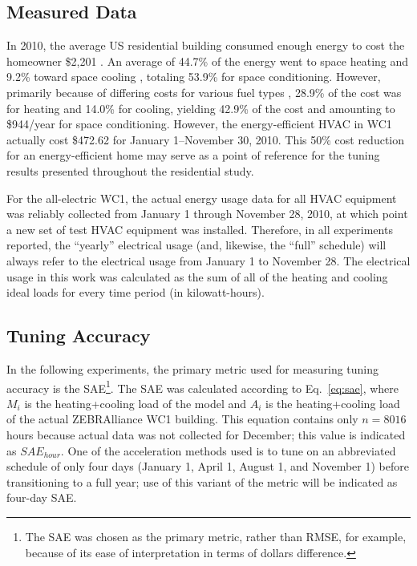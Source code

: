 \documentclass[preprint, review, 12pt]{elsarticle}
\begin{document}
\subsection{Measured Data}
In 2010, the average US residential building consumed enough energy to cost the homeowner \$2,201 \cite{cit:doe2012a}. An average of 44.7\% of the energy went to space heating and 9.2\% toward space cooling \cite{cit:doe2012b}, totaling 53.9\% for space conditioning. However, primarily because of differing costs for various fuel types \cite{cit:doe2012c}, 28.9\% of the cost was for heating and 14.0\% for cooling, yielding 42.9\% of the cost and amounting to \$944/year for space conditioning. However, the energy-efficient HVAC in WC1 actually cost \$472.62 for January 1--November 30, 2010. This 50\% cost reduction for an energy-efficient home may serve as a point of reference for the tuning results presented throughout the residential study.

For the all-electric WC1, the actual energy usage data for all HVAC equipment was reliably collected from January 1 through November 28, 2010, at which point a new set of test HVAC equipment was installed. Therefore, in all experiments reported, the ``yearly'' electrical usage (and, likewise, the ``full'' schedule) will always refer to the electrical usage from January 1 to November 28. The electrical usage in this work was calculated as the sum of all of the heating and cooling ideal loads for every time period (in kilowatt-hours).

\subsection{Tuning Accuracy}
In the following experiments, the primary metric used for measuring tuning accuracy is the SAE\footnote{The SAE was chosen as the primary metric, rather than RMSE, for example, because of its ease of interpretation in terms of dollars difference.}. The SAE was calculated according to Eq.~\ref{eq:sae}, where $M_i$ is the heating+cooling load of the model and $A_i$ is the heating+cooling load of the actual ZEBRAlliance WC1 building. This equation contains only  $n=8016$ hours because actual data was not collected for December; this value is indicated as $SAE_{hour}$. One of the acceleration methods used is to tune on an abbreviated schedule of only four days (January 1, April 1, August 1, and November 1) before transitioning to a full year; use of this variant of the metric will be indicated as four-day SAE.
\end{document}
